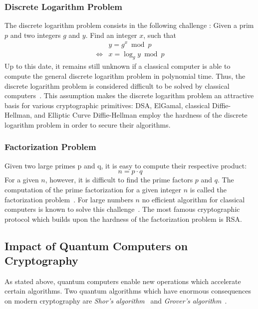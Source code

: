 \subsubsection{Discrete Logarithm Problem} \label{discrete_log_problem}
The discrete logarithm problem consists in the following challenge \parencite{beutelspacher2010diskrete}: Given a prim $p$ and two integers $g$ and $y$. Find an integer $x$, such that
\begin{equation*}
\begin{split}
&y = g^x \bmod p \\
\iff &x = \log_g y \bmod p
\end{split}
\end{equation*}
Up to this date, it remains still unknown if a classical computer is able to compute the general discrete logarithm problem in polynomial time. Thus, the discrete logarithm problem is considered difficult to be solved by classical computers~\parencite{beutelspacher2010diskrete}. This assumption makes the discrete logarithm problem an attractive basis for various cryptographic primitives: \gls{DSA}, ElGamal, classical Diffie-Hellman, and Elliptic Curve Diffie-Hellman employ the hardness of the discrete logarithm problem in order to secure their algorithms.

\subsubsection{Factorization Problem} \label{factorization_problem}

Given two large primes p and q, it is easy to compute their respective product:
\begin{equation*}
n = p \cdot q
\end{equation*}
For a given $n$, however, it is difficult to find the prime factors $p$ and $q$. The computation of the prime factorization for a given integer $n$ is called the factorization problem~\parencite{ITSicherheit}. For large numbers $n$ no efficient algorithm for classical computers is known to solve this challenge~\parencite{ITSicherheit}. The most famous cryptographic protocol which builds upon the hardness of the factorization problem is \gls{RSA}.
\newpage

\subsection{Impact of Quantum Computers on Cryptography}

As stated above, quantum computers enable new operations which accelerate certain algorithms. Two quantum algorithms which have enormous consequences on modern cryptography are \textit{Shor's algorithm}~\parencite{shor1994algorithms} and \textit{Grover's algorithm}~\parencite{grover1996fast}.

